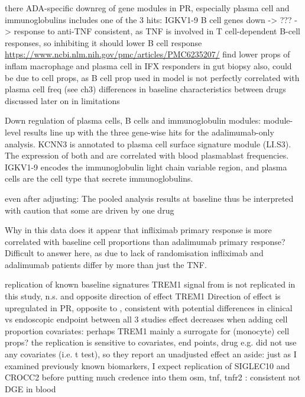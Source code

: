 \begin{outline}
\1 there ADA-specific downreg of gene modules in PR, especially plasma cell and immunoglobulins
    \2 includes one of the 3 hits: IGKV1-9
    \2 B cell genes down -> ??? -> response to anti-TNF
        \3 consistent, as TNF is involved in T cell-dependent B-cell responses, so inhibiting it should lower B cell response \url{https://www.ncbi.nlm.nih.gov/pmc/articles/PMC6235207/}
    \2 \textcite{gaujoux2019CellcentredMetaanalysisReveals} find lower props of inflam macrophage and plasma cell in IFX responders in gut biopsy
    \2 also, could be due to cell props, as B cell prop used in model is not perfectly correlated with plasma cell freq (see ch3)
    \2 differences in baseline characteristics between drugs discussed later on in limitations


Down regulation of plasma cells, B cells and immunoglobulin modules: module-level results line up with the three gene-wise hits for the adalimumab-only analysis.
KCNN3 is annotated to plasma cell surface signature module (LI.S3).
The expression of both  and  are correlated with blood plasmablast frequencies\autocite{tsang2014GlobalAnalysesHuman}.
IGKV1-9 encodes the immunoglobulin light chain variable region, and plasma cells are the cell type that secrete immunoglobulins.

even after adjusting: The pooled analysis results at baseline thus be interpreted with caution that some are driven by one drug

Why in this data does it appear that infliximab primary response is more correlated with baseline cell proportions than adalimumab primary response?
Difficult to answer here, as due to lack of randomisation infliximab and adalimumab patients differ by more than just the \gls{TNF}.

\1 replication of known baseline signatures
    \2 TREM1 signal from \textcite{verstockt2019LowTREM1Expression} is not replicated in this study, n.s. and opposite direction of effect
    \2 TREM1 Direction of effect is upregulated in PR, opposite to \autocite{verstockt2019LowTREM1Expression}, consistent with \autocite{gaujoux2019CellcentredMetaanalysisReveals}
    \2 potential differences in clinical vs endoscopic endpoint between all 3 studies
    \2 effect decreases when adding cell proportion covariates: perhaps TREM1 mainly a surrogate for (monocyte) cell props?
    \2 the replication is sensitive to covariates, end points, drug
        \3 e.g. \textcite{verstockt2019LowTREM1Expression} did not use any covariates (i.e. t test), so they report an unadjusted effect
    \2 an aside: just as I examined previously known biomarkers, I expect replication of SIGLEC10 and CROCC2 before putting much credence into them
    \2 osm, tnf, tnfr2 \autocite{verstockt2019LowTREM1Expression}: consistent not DGE in blood


\end{outline}
